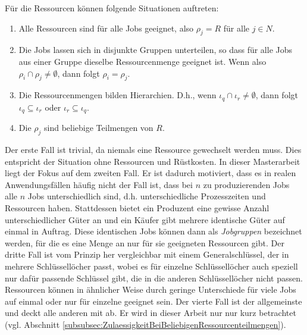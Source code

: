 \documentclass{scrreprt}
\begin{document}
Für die Ressourcen können folgende Situationen auftreten:
\begin{enumerate}
    \item Alle Ressourcen sind für alle Jobs geeignet, also $\rho_j=R$ für alle $j\in N$.
    \item Die Jobs lassen sich in disjunkte Gruppen unterteilen, so dass für alle Jobs aus einer Gruppe dieselbe Ressourcenmenge geeignet ist.
        Wenn also $\rho_i \cap \rho_j \neq \emptyset$, dann folgt $\rho_i=\rho_j$.
    \item Die Ressourcenmengen bilden Hierarchien. 
        D.h., wenn $\iota_q \cap \iota_r \neq \emptyset$, dann folgt $\iota_q \subseteq \iota_r$ oder $\iota_r \subseteq \iota_q$.
    \item Die $\rho_j$ sind beliebige Teilmengen von $R$.
\end{enumerate}%
Der erste Fall ist trivial, da niemals eine Ressource gewechselt werden muss.
Dies entspricht der Situation ohne Ressourcen und Rüstkosten.
In dieser Masterarbeit liegt der Fokus auf dem zweiten Fall.
Er ist dadurch motiviert, dass es in realen Anwendungsfällen häufig nicht der Fall ist, dass bei $n$ zu produzierenden Jobs alle $n$ Jobs unterschiedlich sind,
d.h. unterschiedliche Prozesszeiten und Ressourcen haben.
Stattdessen bietet ein Produzent eine gewisse Anzahl unterschiedlicher Güter an und ein Käufer gibt mehrere identische Güter auf einmal in Auftrag.
Diese identischen Jobs können dann als \textit{Jobgruppen} bezeichnet werden, für die es eine Menge an nur für sie geeigneten Ressourcen gibt.
Der dritte Fall ist vom Prinzip her vergleichbar mit einem Generalschlüssel, der in mehrere Schlüssellöcher passt,
wobei es für einzelne Schlüssellöcher auch speziell nur dafür passende Schlüssel gibt, die in die anderen Schlüssellöcher nicht passen.
Ressourcen können in ähnlicher Weise durch geringe Unterschiede für viele Jobs auf einmal oder nur für einzelne geeignet sein.
Der vierte Fall ist der allgemeinste und deckt alle anderen mit ab.
Er wird in dieser Arbeit nur nur kurz betrachtet (vgl. Abschnitt \ref{subsubsec:ZulaessigkeitBeiBeliebigenRessourcenteilmengen}).
\end{document}
